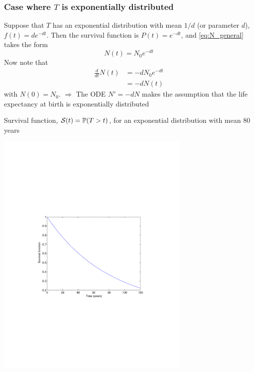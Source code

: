 \documentclass[aspectratio=169]{beamer}\usepackage[]{graphicx}\usepackage[]{xcolor}
\begin{document}
\begin{frame}\frametitle{Case where $T$ is exponentially distributed}
Suppose that $T$ has an exponential distribution with mean $1/d$ (or parameter $d$), $f(t)=de^{-dt}$. Then the survival function is $P(t)=e^{-dt}$, and \eqref{eq:N_general} takes the form
\begin{equation}\label{eq:N}
N(t)=N_0e^{-dt}
\end{equation}
\vfill
Now note that
\begin{align*}
\frac{d}{dt} N(t) &= -dN_0e^{-dt} \\
&= -dN(t)
\end{align*}
with $N(0)=N_0$.
\vfill
{\red $\Rightarrow$} The ODE $N'=-dN$ makes the assumption that the life expectancy at birth is exponentially distributed
\end{frame}

\begin{frame}
Survival function, $\mathcal{S}(t)=\mathbb{P}(T>t)$, for an exponential distribution with mean 80 years
\begin{center}
\includegraphics[width=0.7\textwidth]{FIGS/survival_exp_80years}
\end{center}
\end{frame}
\end{document}
